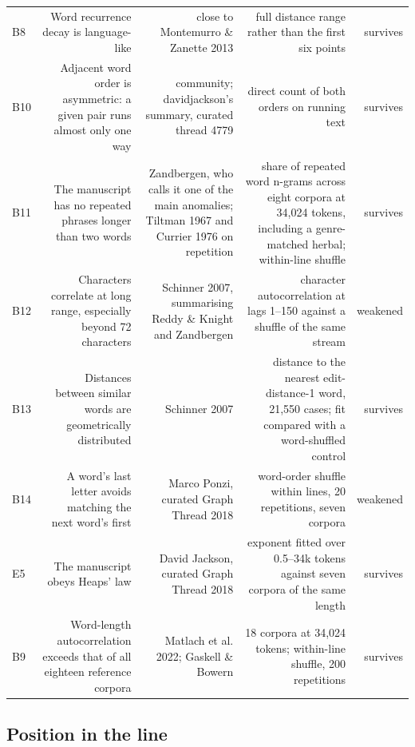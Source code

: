 \documentclass[11pt,a4paper]{article}
\begin{document}
\begin{table}[htbp]
\begin{tabular}{@{}lrrrr@{}}
B8 & Word recurrence decay is language-like & close to Montemurro \& Zanette 2013 & full distance range rather than the first six points & survives \\
B10 & Adjacent word order is asymmetric: a given pair runs almost only one way & community; davidjackson's summary, curated thread 4779 & direct count of both orders on running text & survives \\
B11 & The manuscript has no repeated phrases longer than two words & Zandbergen, who calls it one of the main anomalies; Tiltman 1967 and Currier 1976 on repetition & share of repeated word n-grams across eight corpora at 34,024 tokens, including a genre-matched herbal; within-line shuffle & survives \\
B12 & Characters correlate at long range, especially beyond 72 characters & Schinner 2007, summarising Reddy \& Knight and Zandbergen & character autocorrelation at lags 1--150 against a shuffle of the same stream & weakened \\
B13 & Distances between similar words are geometrically distributed & Schinner 2007 & distance to the nearest edit-distance-1 word, 21,550 cases; fit compared with a word-shuffled control & survives \\
B14 & A word's last letter avoids matching the next word's first & Marco Ponzi, curated Graph Thread 2018 & word-order shuffle within lines, 20 repetitions, seven corpora & weakened \\
E5 & The manuscript obeys Heaps' law & David Jackson, curated Graph Thread 2018 & exponent fitted over 0.5--34k tokens against seven corpora of the same length & survives \\
B9 & Word-length autocorrelation exceeds that of all eighteen reference corpora & Matlach et al. 2022; Gaskell \& Bowern & 18 corpora at 34,024 tokens; within-line shuffle, 200 repetitions & survives \\
\bottomrule
\end{tabular}
\end{table}

\subsection*{Position in the line}
\end{document}
